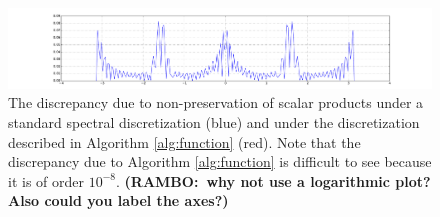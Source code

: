 \documentclass[final,leqno]{siamltex1213}
\newcommand{\ram}[1]{{\normalsize{\textbf{({\color{red}RAMBO:\ }#1)}}}}
\begin{document}
\begin{figure}[h]
	\hspace*{-1.2cm}
	\includegraphics[width=1.15\textwidth]{./images/function_plots/discrepancy}
	\caption{The discrepancy due to non-preservation of scalar products under a standard spectral discretization (blue) and under the discretization described in Algorithm \ref{alg:function} (red). 
	Note that the discrepancy due to Algorithm \ref{alg:function} is difficult to see because it is of order $10^{-8}$. \ram{why not use a logarithmic plot? Also could you label the axes?} }
	\label{fig:discrepancy}
\end{figure}  
\end{document}

